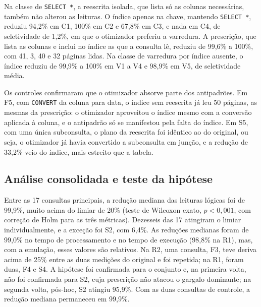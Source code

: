 Na classe de \texttt{SELECT *}, a reescrita isolada, que lista só as colunas necessárias, também não alterou as leituras. O índice apenas na chave, mantendo \texttt{SELECT *}, reduziu 94,2\% em C1, 100\% em C2 e 67,8\% em C3, e nada em C4, de seletividade de 1,2\%, em que o otimizador preferiu a varredura. A prescrição, que lista as colunas e inclui no índice as que a consulta lê, reduziu de 99,6\% a 100\%, com 41, 3, 40 e 32 páginas lidas. Na classe de varredura por índice ausente, o índice reduziu de 99,9\% a 100\% em V1 a V4 e 98,9\% em V5, de seletividade média.

\begin{table}[H]
\centering
{}
\end{table}

Os controles confirmaram que o otimizador absorve parte dos antipadrões. Em F5, com \texttt{CONVERT} da coluna para data, o índice sem reescrita já leu 50 páginas, as mesmas da prescrição: o otimizador aproveitou o índice mesmo com a conversão aplicada à coluna, e o antipadrão só se manifestou pela falta do índice. Em S5, com uma única subconsulta, o plano da reescrita foi idêntico ao do original, ou seja, o otimizador já havia convertido a subconsulta em junção, e a redução de 33,2\% veio do índice, mais estreito que a tabela.

\subsection{Análise consolidada e teste da hipótese}\label{sec:hipotese}

Entre as 17 consultas principais, a redução mediana das leituras lógicas foi de 99,9\%, muito acima do limiar de 20\% (teste de Wilcoxon exato, $p < 0{,}001$, com correção de Holm para as três métricas). Dezesseis das 17 atingiram o limiar individualmente, e a exceção foi S2, com 6,4\%. As reduções medianas foram de 99,0\% no tempo de processamento e no tempo de execução (98,8\% na R1), mas, com a emulação, esses valores são relativos. Na R2, uma consulta, F3, teve deriva acima de 25\% entre as duas medições do original e foi repetida; na R1, foram duas, F4 e S4. A hipótese foi confirmada para o conjunto e, na primeira volta, não foi confirmada para S2, cuja prescrição não atacou o gargalo dominante; na segunda volta, pós-hoc, S2 atingiu 95,9\%. Com as duas consultas de controle, a redução mediana permaneceu em 99,9\%.


